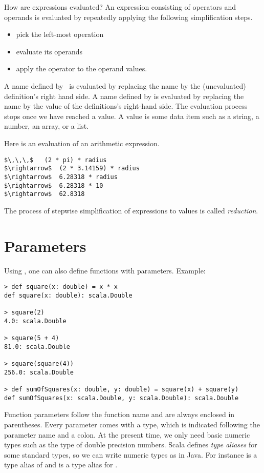 How are expressions evaluated? An expression consisting of operators
and operands is evaluated by repeatedly applying the following
simplification steps.
\begin{itemize}
\item pick the left-most operation
\item evaluate its operands
\item apply the operator to the operand values.
\end{itemize}
A name defined by \ is evaluated by replacing the name by the
(unevaluated) definition's right hand side. A name defined by  is
evaluated by replacing the name by the value of the definitions's
right-hand side.  The evaluation process stops once we have reached a
value. A value is some data item such as a string, a number, an array,
or a list.

\example
Here is an evaluation of an arithmetic expression.
\begin{lstlisting}
$\,\,\,$   (2 * pi) * radius
$\rightarrow$  (2 * 3.14159) * radius
$\rightarrow$  6.28318 * radius
$\rightarrow$  6.28318 * 10
$\rightarrow$  62.8318
\end{lstlisting}
The process of stepwise simplification of expressions to values is
called {\em reduction}.

\section{Parameters}

Using , one can also define functions with parameters. Example:
\begin{lstlisting}
> def square(x: double) = x * x
def square(x: double): scala.Double

> square(2)
4.0: scala.Double

> square(5 + 4)
81.0: scala.Double

> square(square(4))
256.0: scala.Double

> def sumOfSquares(x: double, y: double) = square(x) + square(y)
def sumOfSquares(x: scala.Double, y: scala.Double): scala.Double
\end{lstlisting}

Function parameters follow the function name and are always enclosed
in parentheses.  Every parameter comes with a type, which is indicated
following the parameter name and a colon.  At the present time, we
only need basic numeric types such as the type  of
double precision numbers. Scala defines {\em type aliases} for some
standard types, so we can write numeric types as in Java. For instance
 is a type alias of  and  is
a type alias for .

